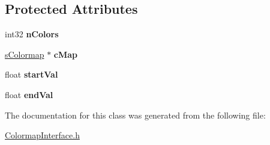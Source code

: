 \subsection*{Protected Attributes}
\begin{DoxyCompactItemize}
\item 
\hypertarget{classColormapInterface_a53e082b9c531202c5a2c16ab8756cd12}{
int32 {\bfseries nColors}}
\label{classColormapInterface_a53e082b9c531202c5a2c16ab8756cd12}

\item 
\hypertarget{classColormapInterface_a8296ac6513e88ddfb8b33fbb64cf4a8f}{
\hyperlink{structsColormap}{sColormap} $\ast$ {\bfseries cMap}}
\label{classColormapInterface_a8296ac6513e88ddfb8b33fbb64cf4a8f}

\item 
\hypertarget{classColormapInterface_af09c625b10de3076dccfc8723a36c59a}{
float {\bfseries startVal}}
\label{classColormapInterface_af09c625b10de3076dccfc8723a36c59a}

\item 
\hypertarget{classColormapInterface_a55bb9c728c3629125ef9fbd5ed2d7d5a}{
float {\bfseries endVal}}
\label{classColormapInterface_a55bb9c728c3629125ef9fbd5ed2d7d5a}

\end{DoxyCompactItemize}


The documentation for this class was generated from the following file:\begin{DoxyCompactItemize}
\item 
\hyperlink{ColormapInterface_8h}{ColormapInterface.h}\end{DoxyCompactItemize}
